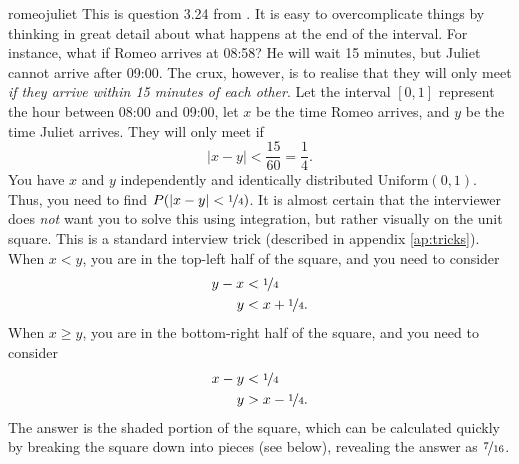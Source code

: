 \begin{answer}{romeojuliet}
This is question 3.24 from \citet{JoshiQA}.
It is easy to overcomplicate things by thinking in great detail about what happens at the end of the interval.
For instance, what if Romeo arrives at 08:58? He will wait 15 minutes, but Juliet cannot arrive after 09:00.
The crux, however, is to realise that they will only meet \emph{if they arrive within 15 minutes of each other}.
Let the interval $[0,1]$ represent the hour between 08:00 and 09:00, let $x$ be the time Romeo arrives, and $y$ be the time Juliet arrives.
They will only meet if
\[
  |x - y| < \frac{15}{60} = \frac{1}{4}
  \text{.}
\]
You have
$x$ and $y$
independently and identically distributed
$\text{Uniform}(0,1)$.
Thus, you need to find $P(\lvert x - y\rvert < \nicefrac{1}{4})$.
It is almost certain that the interviewer does \emph{not} want you to solve this using integration,
but rather visually on the unit square.
This is a standard interview trick (described in appendix \ref{ap:tricks}).
When $x<y$, you are in the top-left half of the square, and you need to consider
\begin{align*}
  y-x &< \nicefrac{1}{4} \\
  y &< x + \nicefrac{1}{4}
  \text{.}
\end{align*}
When $x \geq y$, you are in the bottom-right half of the square, and you need to consider
\begin{align*}
  x-y &< \nicefrac{1}{4} \\
  y  &> x -\nicefrac{1}{4}
  \text{.}
\end{align*}
The answer is the shaded portion of the square, which can be calculated quickly by breaking the square down into pieces (see below), revealing the answer as $\nicefrac{7}{16}$.
\begin{center}

\end{center}
\end{answer}
